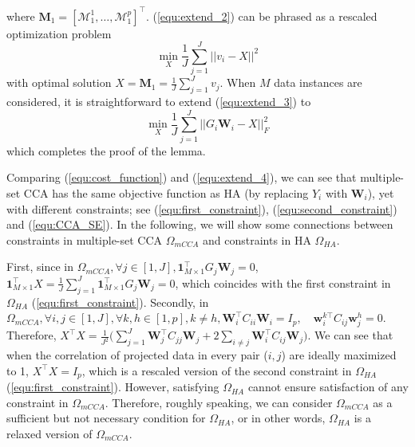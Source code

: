 \documentclass[a4paper]{article}
\newtheorem{lemma}[theorem]{Lemma}
\newenvironment{proof}[1][Proof]{\begin{trivlist}
\item[\hskip \labelsep {\bfseries #1}]}{\end{trivlist}}
\newcommand{\qed}{\nobreak \ifvmode \relax \else
      \ifdim\lastskip<1.5em \hskip-\lastskip
      \hskip1.5em plus0em minus0.5em \fi \nobreak
      \vrule height0.75em width0.5em depth0.25em\fi}
\begin{document}
\begin{proof}
    where $\mathbf{M}_1=[\mathcal{M}_1^1,\ldots,\mathcal{M}_1^p]^\top$. (\ref{equ:extend_2}) can be phrased as a rescaled optimization problem
    \begin{equation}
        \min_X  \frac{1}{J} \sum_{j=1}^J ||v_i-X||^2
        \label{equ:extend_3}
    \end{equation}
    with optimal solution $X=\mathbf{M}_1=\frac{1}{J}\sum_{j=1}^J v_j$. When $M$ data instances are considered, it is straightforward to extend (\ref{equ:extend_3}) to
    \begin{equation}
        \min_X  \frac{1}{J} \sum_{j=1}^J ||G_i\mathbf{W}_i-X||_F^2
        \label{equ:extend_4}
    \end{equation}
    which completes the proof of the lemma. 
\qed
\end{proof}
Comparing (\ref{equ:cost_function}) and (\ref{equ:extend_4}), we can see that multiple-set CCA has the same objective function as HA (by replacing $Y_i$ with  
$\mathbf{W}_i$), yet with different constraints; see (\ref{equ:first_constraint}), (\ref{equ:second_constraint}) and (\ref{equ:CCA_SE}). In the following, we 
will show some connections between constraints in multiple-set CCA $\Omega_{mCCA}$ and 
constraints in HA $\Omega_{HA}$.

First, since in $\Omega_{mCCA}, \forall j\in[1,J], \mathbf{1}_{M\times 1}^\top G_j \mathbf{W}_j=0$, $\mathbf{1}_{M\times 1}^\top X=\frac{1}{J}\sum_{j=1}^J \mathbf{1}_{M\times 1}^\top G_j \mathbf{W}_j=0$, which coincides with the first constraint in $\Omega_{HA}$ (\ref{equ:first_constraint}).
Secondly,  in $\Omega_{mCCA}, \forall i,j\in[1,J], \forall k,h\in [1,p], k\neq h, \mathbf{W}_i^\top C_{ii} \mathbf{W}_i=I_p, \quad \mathbf{w}_i^{k \top} C_{ij}\mathbf{w}_j^h=0$. 
Therefore,
$
  X^\top X=\frac{1}{J^2} \big(\sum_{j=1}^J\mathbf{W}_j^\top C_{jj}\mathbf{W}_j+2\sum_{i\neq j} \mathbf{W}_i^\top C_{ij}\mathbf{W}_j\big).
$
We can see that when the correlation of projected data in every pair ($i,j$) are ideally maximized to 1, $X^\top X=I_p$, which is a rescaled version of the second constraint 
in $\Omega_{HA}$ (\ref{equ:first_constraint}).
However, satisfying $\Omega_{HA}$ cannot ensure satisfaction of any constraint in $\Omega_{mCCA}$. Therefore, roughly speaking, we can consider $\Omega_{mCCA}$ as a sufficient but not 
necessary condition for $\Omega_{HA}$, or in other words,  $\Omega_{HA}$ is a relaxed version of $\Omega_{mCCA}$.    
\end{document}
